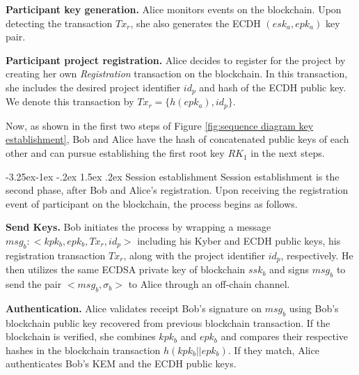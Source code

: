 \documentclass[a4paper,fleqn]{cas-dc}
\makeatletter
\renewcommand\subsubsection{\@startsection{subsubsection}{3}{\z@}%
   {-3.25ex\@plus -1ex \@minus -.2ex}%
   {1.5ex \@plus .2ex}%
   {\normalfont\normalsize}} %
\makeatother
\begin{document}
\noindent\textbf{Participant key generation.} 
Alice monitors events on the blockchain. 
Upon detecting the transaction $Tx_{r}$, she also generates the ECDH $(esk_{a}, epk_{a})$ key pair.

\noindent\textbf{Participant project registration.} 
Alice decides to register for the project by creating her own \textit{Registration} transaction on the blockchain.
In this transaction, she includes the desired project identifier $id_p$ and hash of the ECDH public key. 
We denote this transaction by $Tx_{r}=\{ h(epk_{a}),id_{p}\}$. 

Now, as shown in the first two steps of Figure \ref{fig:sequence diagram key establishment}, Bob and Alice have the hash of concatenated public keys of each other and can pursue establishing the first root key $RK_{1}$ in the next steps.

\subsubsection{Session establishment}
Session establishment is the second phase, after Bob and Alice’s registration. Upon receiving the registration event of participant on the blockchain, the process begins as follows.


\noindent\textbf{Send Keys.} 
Bob initiates the process by wrapping a message $msg_{b}: <kpk_{b},epk_{b},Tx_{r},id_{p}>$ including his Kyber and ECDH public keys, his registration transaction $Tx_{r}$, along with the project identifier $id_{p}$, respectively.
He then utilizes the same ECDSA private key of blockchain $ssk_{b}$ and signs $msg_{b}$ to send the pair $<msg_{b},\sigma_{b}>$ to Alice through an off-chain channel.

\noindent\textbf{Authentication.} 
Alice validates receipt Bob's signature on $msg_{b}$ using Bob's blockchain public key recovered from previous blockchain transaction. 
If the blockchain is verified, she combines $kpk_{b}$ and $epk_{b}$ and compares their respective hashes in the blockchain transaction $h(kpk_{b}||epk_{b})$. 
If they match, Alice authenticates Bob's KEM and the ECDH public keys. 
\end{document}
